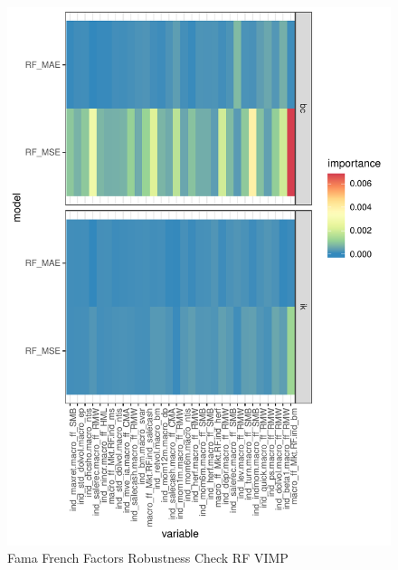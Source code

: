 \documentclass[11pt, a4paper, table]{article}
\begin{document}
\begin{figure}
	\includegraphics[]{../Results/empirical_ff/empirical_vimp.pdf}
	\caption{Fama French Factors Robustness Check RF VIMP}
\end{figure}




\end{document}
